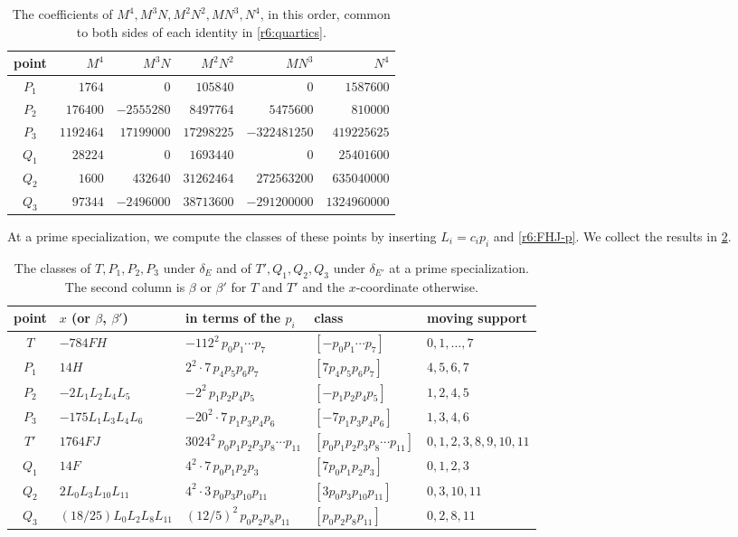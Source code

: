 \documentclass[12pt,oneside,openany]{book}
\theoremstyle{definition}
\theoremstyle{plain}
\numberwithin{equation}{chapter}
\theoremstyle{plain}
\theoremstyle{definition}
\theoremstyle{remark}
\newcommand{\sq}[1]{[#1]}
\begin{document}
\begin{table}[htbp]
\centering
\caption{The coefficients of $M^4,M^3N,M^2N^2,MN^3,N^4$, in this order, common to both sides of each identity in \eqref{r6:quartics}.}
\label{tab:r6-quartics}
\begin{tabular}{crrrrr}
\toprule
point & $M^4$ & $M^3N$ & $M^2N^2$ & $MN^3$ & $N^4$\\
\midrule
$P_1$ & $1764$ & $0$ & $105840$ & $0$ & $1587600$\\
$P_2$ & $176400$ & $-2555280$ & $8497764$ & $5475600$ & $810000$\\
$P_3$ & $1192464$ & $17199000$ & $17298225$ & $-322481250$ & $419225625$\\
$Q_1$ & $28224$ & $0$ & $1693440$ & $0$ & $25401600$\\
$Q_2$ & $1600$ & $432640$ & $31262464$ & $272563200$ & $635040000$\\
$Q_3$ & $97344$ & $-2496000$ & $38713600$ & $-291200000$ & $1324960000$\\
\bottomrule
\end{tabular}
\end{table}

At a prime specialization, we compute the classes of these points by inserting $L_i=c_ip_i$ and \eqref{r6:FHJ-p}. We collect the results in \cref{tab:r6-classes}.

\begin{table}[htbp]
\centering
\caption{The classes of $T,P_1,P_2,P_3$ under $\delta_E$ and of $T',Q_1,Q_2,Q_3$ under $\delta_{E'}$ at a prime specialization. The second column is $\beta$ or $\beta'$ for $T$ and $T'$ and the $x$-coordinate otherwise.}
\label{tab:r6-classes}
\small
\setlength{\tabcolsep}{4pt}
\begin{tabular}{cllll}
\toprule
point & $x$ (or $\beta$, $\beta'$) & in terms of the $p_i$ & class & moving support\\
\midrule
$T$ & $-784FH$ & $-112^2\,p_0p_1\cdots p_7$ & $\sq{-p_0p_1\cdots p_7}$ & $0,1,\dots,7$\\
$P_1$ & $14H$ & $2^2\cdot7\,p_4p_5p_6p_7$ & $\sq{7p_4p_5p_6p_7}$ & $4,5,6,7$\\
$P_2$ & $-2L_1L_2L_4L_5$ & $-2^2\,p_1p_2p_4p_5$ & $\sq{-p_1p_2p_4p_5}$ & $1,2,4,5$\\
$P_3$ & $-175L_1L_3L_4L_6$ & $-20^2\cdot7\,p_1p_3p_4p_6$ & $\sq{-7p_1p_3p_4p_6}$ & $1,3,4,6$\\
\midrule
$T'$ & $1764FJ$ & $3024^2\,p_0p_1p_2p_3p_8\cdots p_{11}$ & $\sq{p_0p_1p_2p_3p_8\cdots p_{11}}$ & $0,1,2,3,8,9,10,11$\\
$Q_1$ & $14F$ & $4^2\cdot7\,p_0p_1p_2p_3$ & $\sq{7p_0p_1p_2p_3}$ & $0,1,2,3$\\
$Q_2$ & $2L_0L_3L_{10}L_{11}$ & $4^2\cdot3\,p_0p_3p_{10}p_{11}$ & $\sq{3p_0p_3p_{10}p_{11}}$ & $0,3,10,11$\\
$Q_3$ & $(18/25)L_0L_2L_8L_{11}$ & $(12/5)^2\,p_0p_2p_8p_{11}$ & $\sq{p_0p_2p_8p_{11}}$ & $0,2,8,11$\\
\bottomrule
\end{tabular}
\end{table}
\end{document}
